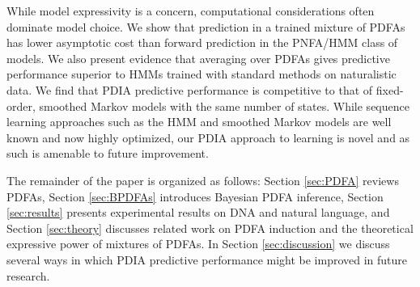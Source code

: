 While model expressivity is a concern, computational considerations often dominate model choice.  We show that prediction in a trained mixture of PDFAs has lower asymptotic cost than forward prediction in the PNFA/HMM class of models.  We also present evidence that averaging over PDFAs gives predictive performance superior to HMMs trained with standard methods on naturalistic data.  We find that PDIA predictive performance is competitive to that of fixed-order, smoothed Markov models with the same number of states.  While sequence learning approaches such as the HMM and smoothed Markov models are well known and now highly optimized, our PDIA approach to learning is novel and as such is amenable to future improvement.  

The remainder of the paper is organized as follows:  Section \ref{sec:PDFA} reviews PDFAs, Section \ref{sec:BPDFAs} introduces Bayesian PDFA inference, Section \ref{sec:results} presents experimental results on DNA and natural language, and Section \ref{sec:theory} discusses related work on PDFA induction and the theoretical expressive power of mixtures of PDFAs.
In Section \ref{sec:discussion} we discuss several ways in which PDIA predictive performance might be improved in future research.

